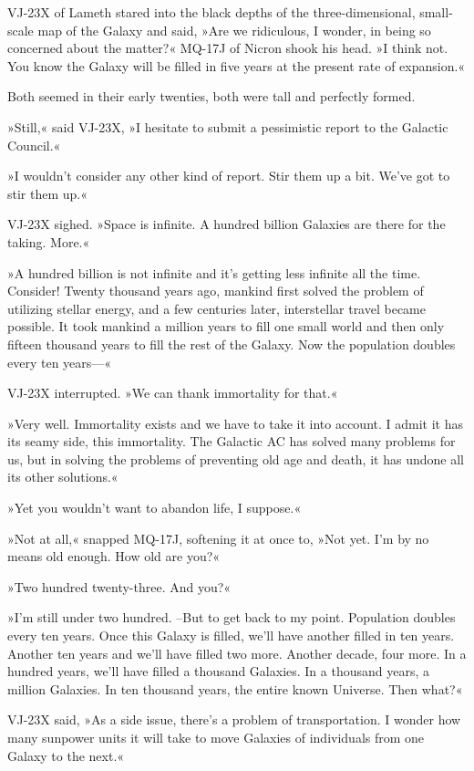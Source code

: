 \documentclass[11pt,twocolumn,paper=a5,pagesize,twoside]{article}
\newcommand{\q}[1]{»#1«}
\newcommand{\futuretwo}[1]{ #1 }
\newcommand{\initial}[1]{ \lettrine[lines=3,lhang=0.3,nindent=0em]{  {\textsf{#1}}}{}}
\begin{document}
\futuretwo{
\initial{V}J-23X of Lameth stared into the black depths of the 
three-dimensional, small-scale map of the Galaxy and said, \q{Are we 
ridiculous, I wonder, in being so concerned about the matter?}
MQ-17J of Nicron shook his head. \q{I think not. You know the Galaxy 
will be filled in five years at the present rate of expansion.}

Both seemed in their early twenties, both were tall and perfectly formed.

\q{Still,} said VJ-23X, \q{I hesitate to submit a pessimistic report to the 
Galactic Council.}

\q{I wouldn't consider any other kind of report. Stir them up a bit. We've 
got to stir them up.}

VJ-23X sighed. \q{Space is infinite. A hundred billion Galaxies are there 
for the taking. More.}

\q{A hundred billion is not infinite and it's getting less infinite all the 
time. Consider! Twenty thousand years ago, mankind first solved the problem 
of utilizing stellar energy, and a few centuries later, interstellar travel 
became possible. It took mankind a million years to fill one small world and 
then only fifteen thousand years to fill the rest of the Galaxy. Now the 
population doubles every ten years---}

VJ-23X interrupted. \q{We can thank immortality for that.}

\q{Very well. Immortality exists and we have to take it into account. I admit 
it has its seamy side, this immortality. The Galactic AC has solved many 
problems for us, but in solving the problems of preventing old age and death, 
it has undone all its other solutions.}

\q{Yet you wouldn't want to abandon life, I suppose.}

\q{Not at all,} snapped MQ-17J, softening it at once to, \q{Not yet. I'm by 
no means old enough. How old are you?}

\q{Two hundred twenty-three. And you?}

\q{I'm still under two hundred. --But to get back to my point. Population 
doubles every ten years. Once this Galaxy is filled, we'll have another 
filled in ten years. Another ten years and we'll have filled two more. 
Another decade, four more. In a hundred years, we'll have filled a thousand
Galaxies. In a thousand years, a million Galaxies. In ten thousand years, 
the entire known Universe. Then what?}

VJ-23X said, \q{As a side issue, there's a problem of transportation. I 
wonder how many sunpower units it will take to move Galaxies of individuals 
from one Galaxy to the next.}

}
\end{document}
